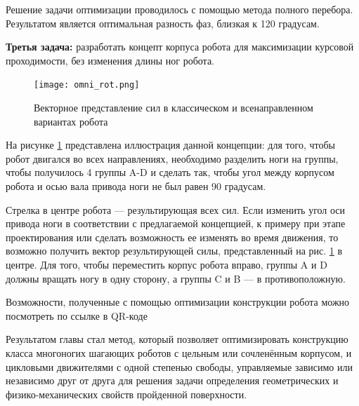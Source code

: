 Решение задачи оптимизации проводилось с помощью метода полного перебора. Результатом является оптимальная разность фаз, близкая к 120 градусам.

\textbf{Третья задача:} разработать концепт корпуса робота для максимизации курсовой проходимости, без изменения длины ног робота.

\begin{figure}[H]
    \centering\texttt{[image: omni\_rot.png]}
    \caption{Векторное представление сил в классическом и всенаправленном вариантах робота}
    \label{fig:omnidirection}
\end{figure}



На рисунке \ref{fig:omnidirection} представлена иллюстрация данной концепции: для того, чтобы робот двигался во всех направлениях, необходимо разделить ноги на группы, чтобы получилось 4 группы A-D и сделать так, чтобы угол между корпусом робота и осью вала привода ноги не был равен 90 градусам. 

Стрелка в центре робота --- результирующая всех сил. Если изменить угол оси привода ноги в соответствии с предлагаемой концепцией, к примеру при этапе проектирования или сделать возможность ее изменять во время движения, то возможно получить вектор результирующей силы, представленный на рис. \ref{fig:omnidirection} в центре. Для того, чтобы переместить корпус робота вправо, группы A и D должны вращать ногу в одну сторону, а группы C и B --- в противоположную.

Возможности, полученные с помощью оптимизации конструкции робота можно посмотреть по ссылке в QR-коде \quad {}

Результатом главы стал метод, который позволяет оптимизировать конструкцию класса многоногих шагающих роботов с цельным или сочленённым корпусом, и цикловыми движителями с одной степенью свободы, управляемые зависимо или независимо друг от друга для решения задачи определения геометрических и физико-механических свойств пройденной поверхности.